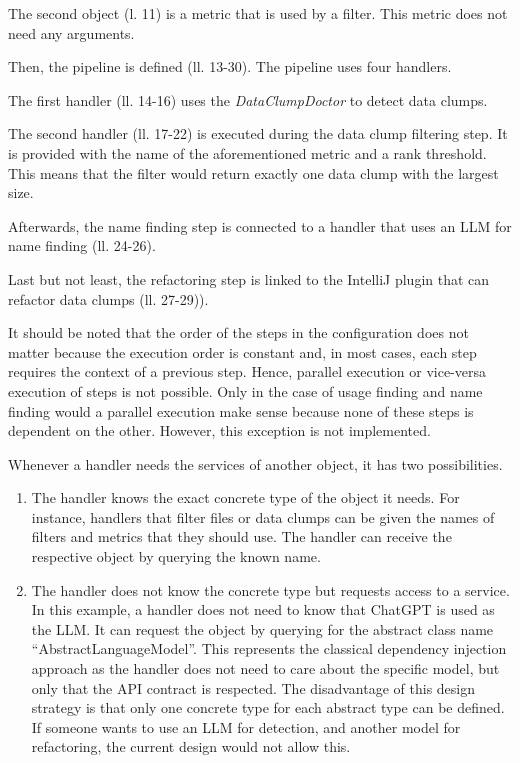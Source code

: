 The second object (l. 11) is a metric that is used by a filter. This metric does not need any arguments.





Then, the pipeline is defined (ll. 13-30). The pipeline uses four handlers. 

The first handler (ll. 14-16) uses the \textit{DataClumpDoctor} to detect data clumps. 


The second handler (ll. 17-22) is executed during the data clump filtering step. It is provided with the name of the aforementioned metric and a rank threshold. This means that the filter would return exactly one data clump with the largest size. 


Afterwards, the name finding step is connected to a handler that uses an \ac{LLM} for name finding (ll. 24-26).

Last but not least, the refactoring step is linked to the IntelliJ plugin that can refactor data clumps (ll. 27-29)). 



It should be noted that the order of the steps in the configuration  does not matter because the execution order is constant and, in most cases, each step requires the context of a previous step. Hence, parallel execution or vice-versa execution of steps is not possible. Only in the case of usage finding and name finding would a parallel execution make sense because none of these steps is dependent on the other.  However, this exception is not implemented.

Whenever a handler needs the services of another object, it has two possibilities.
\begin{enumerate}
    \item The handler knows the exact concrete type of the object it needs. For instance, handlers that filter files or data clumps can be given the names of filters and metrics that they should use. The handler can receive the respective object by querying the known name. 

    \item The handler does not know the concrete type but requests access to a service. In this example, a handler does not need to know that ChatGPT is used as the \ac{LLM}. It can request the object by querying for the abstract class name \enquote{AbstractLanguageModel}. This represents the classical dependency injection approach as the handler does not need to care about the specific model, but only that the \ac{API} contract is respected. The disadvantage of this design strategy is that only one  concrete type for each abstract type can be defined. If someone wants to use an \ac{LLM} for detection, and another model for refactoring, the current design would not allow this. 
\end{enumerate}



